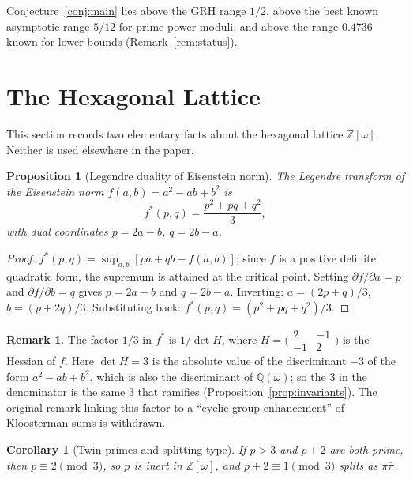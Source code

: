 \documentclass[12pt]{amsart}
\theoremstyle{plain}
\newtheorem{proposition}[theorem]{Proposition}
\newtheorem{corollary}[theorem]{Corollary}
\theoremstyle{definition}
\newtheorem{remark}[theorem]{Remark}
\newcommand{\Z}{\mathbb{Z}}
\newcommand{\Q}{\mathbb{Q}}
\newcommand{\Zomega}{\Z[\omega]}
\newcommand{\Qomega}{\Q(\omega)}
\begin{document}
Conjecture~\ref{conj:main} lies above the GRH range $1/2$, above the best
known asymptotic range $5/12$ for prime-power moduli, and above the range
$0.4736$ known for lower bounds (Remark~\ref{rem:status}).

\section{The Hexagonal Lattice}
\label{sec:geometry}

This section records two elementary facts about the hexagonal lattice
$\Zomega$. Neither is used elsewhere in the paper.

\begin{proposition}[Legendre duality of Eisenstein norm]
\label{prop:legendre}
The Legendre transform of the Eisenstein norm $f(a,b) = a^2 - ab + b^2$ is
\[
  f^*(p,q) = \frac{p^2 + pq + q^2}{3},
\]
with dual coordinates $p = 2a-b$, $q = 2b-a$.
\end{proposition}

\begin{proof}
$f^*(p,q) = \sup_{a,b}[pa + qb - f(a,b)]$; since $f$ is a positive definite
quadratic form, the supremum is attained at the critical point. Setting
$\partial f/\partial a = p$
and $\partial f/\partial b = q$ gives $p = 2a - b$ and $q = 2b - a$. Inverting:
$a = (2p+q)/3$, $b = (p+2q)/3$. Substituting back:
$f^*(p,q) = (p^2 + pq + q^2)/3$.
\end{proof}

\begin{remark}
The factor $1/3$ in $f^*$ is $1/\det H$, where
$H = \bigl(\begin{smallmatrix} 2 & -1 \\ -1 & 2 \end{smallmatrix}\bigr)$ is
the Hessian of $f$. Here $\det H = 3$ is the absolute value of the
discriminant $-3$ of the form $a^2 - ab + b^2$, which is also the
discriminant of $\Qomega$; so the $3$ in the denominator is the same $3$
that ramifies (Proposition~\ref{prop:invariants}). The original remark
linking this factor to a ``cyclic group enhancement'' of Kloosterman sums is
withdrawn.
\end{remark}

\begin{corollary}[Twin primes and splitting type]
\label{cor:twinprime}
If $p > 3$ and $p + 2$ are both prime, then $p \equiv 2 \pmod{3}$, so $p$ is
inert in $\Zomega$, and $p + 2 \equiv 1 \pmod{3}$ splits as $\pi\bar\pi$.
\end{corollary}
\end{document}
